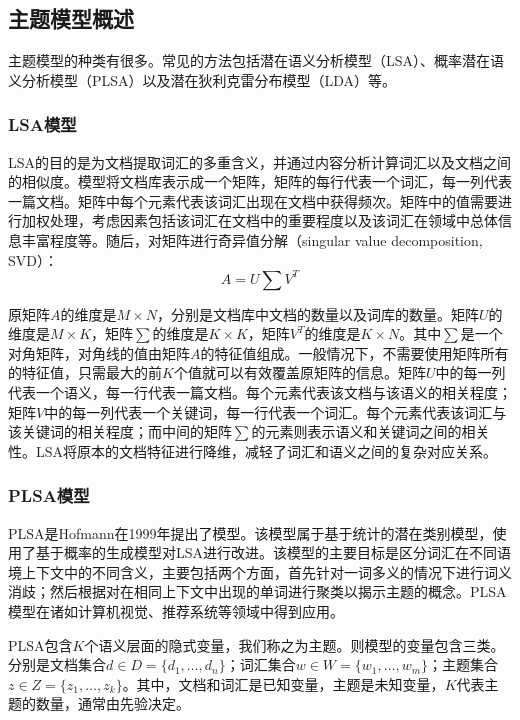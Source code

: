 \subsection{主题模型概述}

主题模型的种类有很多。常见的方法包括潜在语义分析模型（LSA）、概率潜在语义分析模型（PLSA）以及潜在狄利克雷分布模型（LDA）等。

\subsubsection{LSA模型}
LSA\parencite{deerwester1990indexing}的目的是为文档提取词汇的多重含义，并通过内容分析计算词汇以及文档之间的相似度。模型将文档库表示成一个矩阵，矩阵的每行代表一个词汇，每一列代表一篇文档。矩阵中每个元素代表该词汇出现在文档中获得频次。矩阵中的值需要进行加权处理，考虑因素包括该词汇在文档中的重要程度以及该词汇在领域中总体信息丰富程度等。随后，对矩阵进行奇异值分解（singular value decomposition, SVD）\parencite{golub1970singular}：
\begin{equation}
	A = U\sum V^T
\end{equation}

原矩阵$A$的维度是$M \times N$，分别是文档库中文档的数量以及词库的数量。矩阵$U$的维度是$M \times K$，矩阵$\sum$的维度是$K \times K$，矩阵$V^T$的维度是$K \times N$。其中$\sum$是一个对角矩阵，对角线的值由矩阵$A$的特征值组成。一般情况下，不需要使用矩阵所有的特征值，只需最大的前$K$个值就可以有效覆盖原矩阵的信息。矩阵$U$中的每一列代表一个语义，每一行代表一篇文档。每个元素代表该文档与该语义的相关程度；矩阵$V$中的每一列代表一个关键词，每一行代表一个词汇。每个元素代表该词汇与该关键词的相关程度；而中间的矩阵$\sum$的元素则表示语义和关键词之间的相关性。LSA将原本的文档特征进行降维，减轻了词汇和语义之间的复杂对应关系。

\subsubsection{PLSA模型}
PLSA是Hofmann\parencite{hofmann1999probabilistic}在1999年提出了模型。该模型属于基于统计的潜在类别模型，使用了基于概率的生成模型对LSA进行改进。该模型的主要目标是区分词汇在不同语境上下文中的不同含义，主要包括两个方面，首先针对一词多义的情况下进行词义消歧；然后根据对在相同上下文中出现的单词进行聚类以揭示主题的概念。PLSA模型在诸如计算机视觉、推荐系统等领域中得到应用。

PLSA包含$K$个语义层面的隐式变量，我们称之为主题。则模型的变量包含三类。分别是文档集合$d \in D = \{d_1, \dots, d_n\}$；词汇集合$w \in W = \{w_1, \dots, w_m\}$；主题集合$z \in Z = \{z_1, \dots, z_k\}$。其中，文档和词汇是已知变量，主题是未知变量，$K$代表主题的数量，通常由先验决定。

